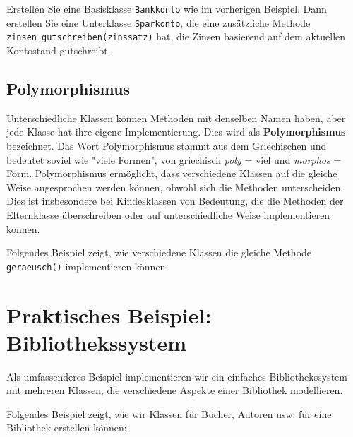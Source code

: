 \begin{myexercise}
	Erstellen Sie eine Basisklasse \lstinline|Bankkonto| wie im vorherigen Beispiel. Dann erstellen Sie eine Unterklasse \lstinline|Sparkonto|, die eine zusätzliche Methode \lstinline|zinsen_gutschreiben(zinssatz)| hat, die Zinsen basierend auf dem aktuellen Kontostand gutschreibt.

	\begin{myanswer}
		\leavevmode
		
	\end{myanswer}
\end{myexercise}

\subsection{Polymorphismus}
Unterschiedliche Klassen können Methoden mit denselben Namen haben, aber jede Klasse hat ihre eigene Implementierung. Dies wird als \textbf{Polymorphismus} bezeichnet. Das Wort Polymorphismus stammt aus dem Griechischen und bedeutet soviel wie "viele Formen", von griechisch \textit{poly} = viel und \textit{morphos} = Form. Polymorphismus ermöglicht, dass verschiedene Klassen auf die gleiche Weise angesprochen werden können, obwohl sich die Methoden unterscheiden. Dies ist insbesondere bei Kindesklassen von Bedeutung, die die Methoden der Elternklasse überschreiben oder auf unterschiedliche Weise implementieren können.

\begin{myexample}[Polymorphismus] Folgendes Beispiel zeigt, wie verschiedene Klassen die gleiche Methode \lstinline|geraeusch()| implementieren können:
	\leavevmode

\end{myexample}


\section{Praktisches Beispiel: Bibliothekssystem}

Als umfassenderes Beispiel implementieren wir ein einfaches Bibliothekssystem mit mehreren Klassen, die verschiedene Aspekte einer Bibliothek modellieren.

\begin{myexample}[Bibliothekssystem]Folgendes Beispiel zeigt, wie wir Klassen für Bücher, Autoren usw. für eine Bibliothek erstellen können:

\end{myexample}

